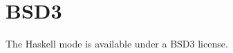 \documentclass[a4paper]{article}
\begin{document}




\section{BSD3}

The Haskell mode is available under a BSD3 license.



\end{document}
